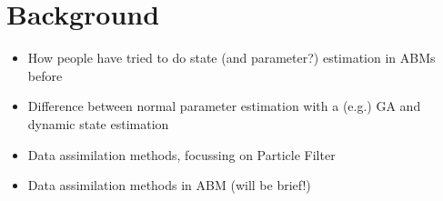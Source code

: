\section{Background\label{background}}

\begin{itemize}
\item How people have tried to do state (and parameter?) estimation in ABMs before
\item Difference between normal parameter estimation with a (e.g.) GA and dynamic state estimation
\item Data assimilation methods, focussing on Particle Filter
\item Data assimilation methods in ABM (will be brief!)
\end{itemize}
